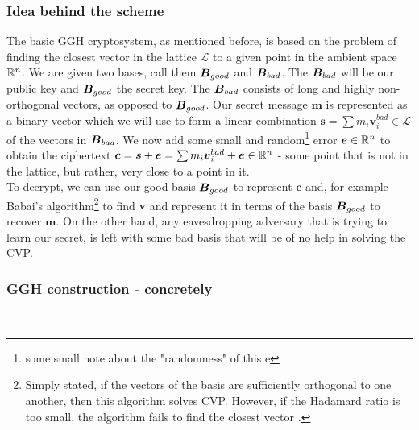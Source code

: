 \subsubsection*{Idea behind the scheme}
The basic GGH cryptosystem, as mentioned before, is based on the problem of finding the closest vector in the lattice $\mathcal{L}$ to a given point in the ambient space $\mathbb{R}^n$. We are given two bases, call them $\boldsymbol{B}_{good}$ and $\boldsymbol{B}_{bad}$. The $\boldsymbol{B}_{bad}$ will be our public key and $\boldsymbol{B}_{good}$ the secret key. The $\boldsymbol{B}_{bad}$ consists of long and highly non-orthogonal vectors, as opposed to $\boldsymbol{B}_{good}$. Our secret message $\bm{m}$ is represented as a binary vector which we will use to form a linear combination $\bm{s} = \sum m_i \bm{v}_i^{bad} \in \mathcal{L}$ of the vectors in $\boldsymbol{B}_{bad}$. We now add some small and random\footnote{some small note about the "randomness" of this e} error $\boldsymbol{e} \in \mathbb{R}^n$ to obtain the ciphertext $\boldsymbol{c} = \boldsymbol{s} + \boldsymbol{e} = \sum m_i \boldsymbol{v}_i^{bad} + \boldsymbol{e} \in \mathbb{R}^n$ - some point that is not in the lattice, but rather, very close to a point in it.\\
To decrypt, we can use our good basis $\boldsymbol{B}_{good}$ to represent $\bm{c}$ and, for example Babai's algorithm\footnote{Simply stated, if the vectors of the basis are sufficiently orthogonal to one another, then this algorithm solves CVP. However, if the Hadamard ratio is too small, the algorithm fails to find the closest vector \cite{book}.} to find $\bm{v}$ and represent it in terms of the basis $\boldsymbol{B}_{good}$ to recover $\bm{m}$. On the other hand, any eavesdropping adversary that is trying to learn our secret, is left with some bad basis that will be of no help in solving the CVP.

\subsubsection*{GGH construction - concretely}
\noindent{} \\


